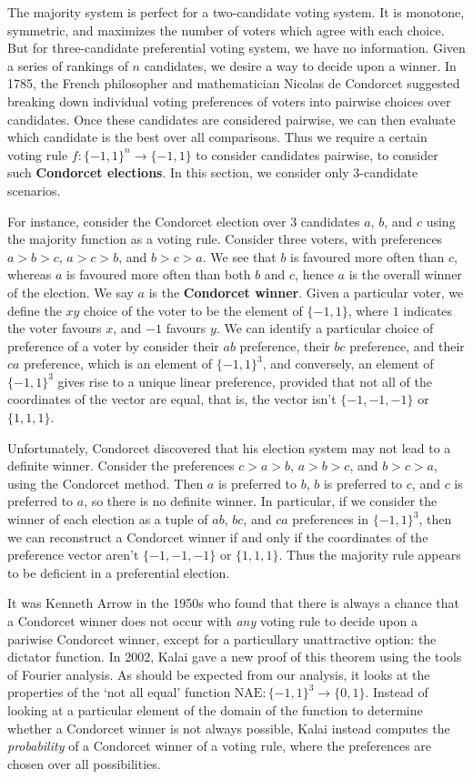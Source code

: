 The majority system is perfect for a two-candidate voting system. It is monotone, symmetric, and maximizes the number of voters which agree with each choice. But for three-candidate preferential voting system, we have no information. Given a series of rankings of $n$ candidates, we desire a way to decide upon a winner. In 1785, the French philosopher and mathematician Nicolas de Condorcet suggested breaking down individual voting preferences of voters into pairwise choices over candidates. Once these candidates are considered pairwise, we can then evaluate which candidate is the best over all comparisons. Thus we require a certain voting rule $f: \{ -1, 1 \}^n \to \{ -1, 1 \}$ to consider candidates pairwise, to consider such {\bf Condorcet elections}. In this section, we consider only 3-candidate scenarios.

For instance, consider the Condorcet election over 3 candidates $a$, $b$, and $c$ using the majority function as a voting rule. Consider three voters, with preferences $a > b > c$, $a > c > b$, and $b > c > a$. We see that $b$ is favoured more often than $c$, whereas $a$ is favoured more often than both $b$ and $c$, hence $a$ is the overall winner of the election. We say $a$ is the {\bf Condorcet winner}. Given a particular voter, we define the $xy$ choice of the voter to be the element of $\{ -1, 1 \}$, where $1$ indicates the voter favours $x$, and $-1$ favours $y$. We can identify a particular choice of preference of a voter by consider their $ab$ preference, their $bc$ preference, and their $ca$ preference, which is an element of $\{ -1, 1 \}^3$, and conversely, an element of $\{ -1, 1 \}^3$ gives rise to a unique linear preference, provided that not all of the coordinates of the vector are equal, that is, the vector isn't $\{ -1, -1, -1 \}$ or $\{ 1, 1, 1 \}$.

Unfortunately, Condorcet discovered that his election system may not lead to a definite winner. Consider the preferences $c > a > b$, $a > b > c$, and $b > c > a$, using the Condorcet method. Then $a$ is preferred to $b$, $b$ is preferred to $c$, and $c$ is preferred to $a$, so there is no definite winner. In particular, if we consider the winner of each election as a tuple of $ab$, $bc$, and $ca$ preferences in $\{ -1, 1 \}^3$, then we can reconstruct a Condorcet winner if and only if the coordinates of the preference vector aren't $\{ -1, -1, -1 \}$ or $\{ 1, 1, 1 \}$. Thus the majority rule appears to be deficient in a preferential election.

It was Kenneth Arrow in the 1950s who found that there is always a chance that a Condorcet winner does not occur with {\it any} voting rule to decide upon a pariwise Condorcet winner, except for a particullary unattractive option: the dictator function. In 2002, Kalai gave a new proof of this theorem using the tools of Fourier analysis. As should be expected from our analysis, it looks at the properties of the `not all equal' function $\text{NAE}: \{ -1, 1 \}^3 \to \{ 0, 1 \}$. Instead of looking at a particular element of the domain of the function to determine whether a Condorcet winner is not always possible, Kalai instead computes the {\it probability} of a Condorcet winner of a voting rule, where the preferences are chosen over all possibilities. 

